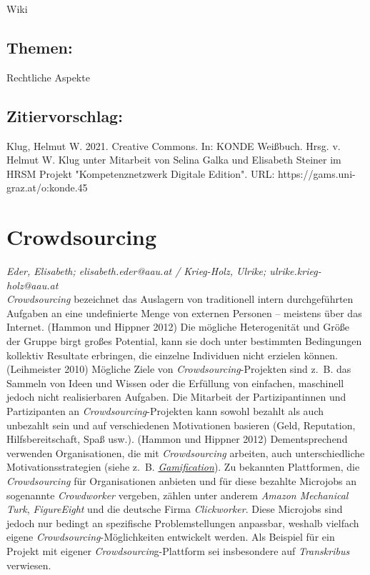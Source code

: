 \documentclass{article}
\begin{document}
{                           Wiki}\subsection*{Themen:}Rechtliche Aspekte\subsection*{Zitiervorschlag:}Klug, Helmut W. 2021. Creative Commons. In: KONDE Weißbuch. Hrsg. v. Helmut W. Klug unter Mitarbeit von Selina Galka und Elisabeth Steiner im HRSM Projekt "Kompetenznetzwerk Digitale Edition". URL: https://gams.uni-graz.at/o:konde.45\newpage\section*{Crowdsourcing} \emph{Eder, Elisabeth; elisabeth.eder@aau.at / Krieg-Holz, Ulrike; ulrike.krieg-holz@aau.at }\\
        
    \emph{Crowdsourcing} bezeichnet das Auslagern von traditionell intern durchgeführten Aufgaben an eine undefinierte Menge von externen Personen – meistens über das Internet. (Hammon und Hippner 2012) Die mögliche Heterogenität und Größe der Gruppe birgt großes Potential, kann sie doch unter bestimmten Bedingungen kollektiv Resultate erbringen, die einzelne Individuen nicht erzielen können. (Leihmeister 2010) Mögliche Ziele von \emph{Crowdsourcing}-Projekten sind z. B. das Sammeln von Ideen und Wissen oder die Erfüllung von einfachen, maschinell jedoch nicht realisierbaren Aufgaben. Die Mitarbeit der Partizipantinnen und Partizipanten an \emph{Crowdsourcing}-Projekten kann sowohl bezahlt als auch unbezahlt sein und auf verschiedenen Motivationen basieren (Geld, Reputation, Hilfsbereitschaft, Spaß  usw.). (Hammon und Hippner 2012) Dementsprechend verwenden Organisationen, die mit \emph{Crowdsourcing} arbeiten, auch unterschiedliche Motivationsstrategien (siehe z. B. \emph{\href{http://gams.uni-graz.at/o:konde.89}{Gamification}}). Zu bekannten Plattformen, die \emph{Crowdsourcing} für Organisationen anbieten und für diese bezahlte Microjobs an sogenannte \emph{Crowdworker} vergeben, zählen unter anderem \emph{Amazon Mechanical Turk}, \emph{FigureEight} und die deutsche Firma \emph{Clickworker}. Diese Microjobs sind jedoch nur bedingt an spezifische Problemstellungen anpassbar, weshalb vielfach eigene \emph{Crowdsourcing}-Möglichkeiten entwickelt werden. Als Beispiel für ein Projekt mit eigener \emph{Crowdsourcin}g-Plattform sei insbesondere auf \emph{Transkribus} verwiesen.\\
            
\end{document}
